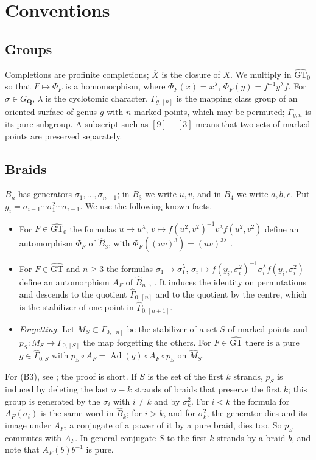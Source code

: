 \documentclass[11pt,a4paper]{article}
\theoremstyle{plain}
\theoremstyle{definition}
\theoremstyle{remark}
\newcommand{\GT}{\widehat{\mathrm{GT}}}
\newcommand{\GTz}{\widehat{\mathrm{GT}}_0}
\newcommand{\GQ}{G_{\mathbf Q}}
\newcommand{\Bh}{\widehat B}
\newcommand{\Gh}{\widehat\Gamma}
\newcommand{\Ad}{\operatorname{Ad}}
\begin{document}
\section{Conventions}\label{sec:conv}

\subsection*{Groups}
Completions are profinite completions; $\overline{X}$ is the closure of $X$. We multiply in $\GTz$ so that
$F\mapsto\Phi_F$ is a homomorphism, where $\Phi_F(x)=x^\lambda$, $\Phi_F(y)=f^{-1}y^\lambda f$. For
$\sigma\in\GQ$, $\lambda$ is the cyclotomic character. $\Gamma_{g,[n]}$ is the mapping class group of an oriented
surface of genus $g$ with $n$ marked points, which may be permuted; $\Gamma_{g,n}$ is its pure subgroup. A subscript
such as $[9]+[3]$ means that two sets of marked points are preserved separately.

\subsection*{Braids}
$B_n$ has generators $\sigma_1,\dots,\sigma_{n-1}$; in $B_3$ we write $u,v$, and in $B_4$ we write $a,b,c$. Put
$y_i=\sigma_{i-1}\cdots\sigma_1^2\cdots\sigma_{i-1}$. We use the following known facts.
\begin{itemize}
\item[(B1)] For $F\in\GTz$ the formulas $u\mapsto u^\lambda$, $v\mapsto f(u^2,v^2)^{-1}v^\lambda f(u^2,v^2)$ define an
automorphism $\Phi_F$ of $\Bh_3$, with $\Phi_F((uv)^3)=(uv)^{3\lambda}$ \cite{LS,HS}.
\item[(B2)] For $F\in\GT$ and $n\ge3$ the formulas $\sigma_1\mapsto\sigma_1^\lambda$,
$\sigma_i\mapsto f(y_i,\sigma_i^2)^{-1}\sigma_i^\lambda f(y_i,\sigma_i^2)$ define an automorphism $A_F$ of $\Bh_n$
\cite{D,LS}, \cite[Theorem 2.1]{LNS}. It induces the identity on permutations and descends to the quotient
$\Gh_{0,[n]}$ and to the quotient by the centre, which is the stabilizer of one point in $\Gh_{0,[n+1]}$.
\item[(B3)] \emph{Forgetting.} Let $M_S\subset\Gamma_{0,[n]}$ be the stabilizer of a set $S$ of marked points and
$p_S:M_S\to\Gamma_{0,[S]}$ the map forgetting the others. For $F\in\GT$ there is a pure $g\in\Gh_{0,S}$ with
$p_S\circ A_F=\Ad(g)\circ A_F\circ p_S$ on $\widehat M_S$.
\end{itemize}
For (B3), see \cite[\S3.1]{HS}; the proof is short. If $S$ is the set of the first $k$ strands, $p_S$ is induced by
deleting the last $n-k$ strands of braids that preserve the first $k$; this group is generated by the $\sigma_i$
with $i\ne k$ and by $\sigma_k^2$. For $i<k$ the formula for $A_F(\sigma_i)$ is the same word in $\Bh_k$; for $i>k$,
and for $\sigma_k^2$, the generator dies and its image under $A_F$, a conjugate of a power of it by a pure braid,
dies too. So $p_S$ commutes with $A_F$. In general conjugate $S$ to the first $k$ strands by a braid $b$, and note
that $A_F(b)b^{-1}$ is pure.
\end{document}

